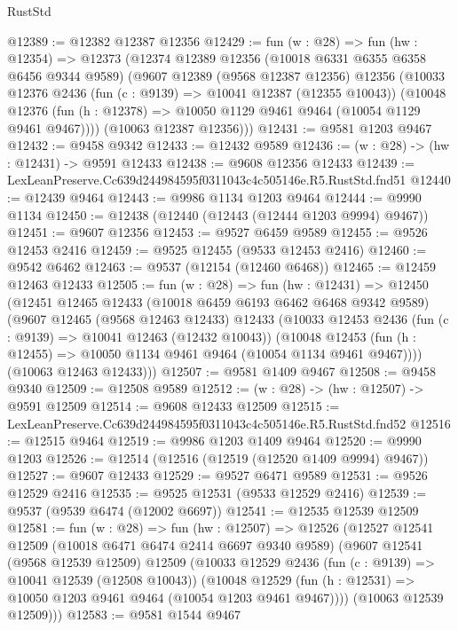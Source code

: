 \begin{lexlean}{RustStd}
\begin{coremodule}
@12389 := @12382 @12387 @12356
@12429 := fun (w : @28) =>
  fun (hw : @12354) =>
  @12373
    (@12374
      @12389
      @12356
      (@10018 @6331 @6355 @6358 @6456 @9344 @9589)
      (@9607
        @12389
        (@9568 @12387 @12356)
        @12356
        (@10033
          @12376
          @2436
          (fun (c : @9139) => @10041 @12387 (@12355 @10043))
          (@10048 @12376 (fun (h : @12378) => @10050 @1129 @9461 @9464 (@10054 @1129 @9461 @9467))))
        (@10063 @12387 @12356)))
@12431 := @9581 @1203 @9467
@12432 := @9458 @9342
@12433 := @12432 @9589
@12436 := (w : @28) -> (hw : @12431) -> @9591 @12433
@12438 := @9608 @12356 @12433
@12439 := LexLeanPreserve.Cc639d244984595f0311043c4c505146e.R5.RustStd.fnd51
@12440 := @12439 @9464
@12443 := @9986 @1134 @1203 @9464
@12444 := @9990 @1134
@12450 := @12438 (@12440 (@12443 (@12444 @1203 @9994) @9467))
@12451 := @9607 @12356
@12453 := @9527 @6459 @9589
@12455 := @9526 @12453 @2416
@12459 := @9525 @12455 (@9533 @12453 @2416)
@12460 := @9542 @6462
@12463 := @9537 (@12154 (@12460 @6468))
@12465 := @12459 @12463 @12433
@12505 := fun (w : @28) =>
  fun (hw : @12431) =>
  @12450
    (@12451
      @12465
      @12433
      (@10018 @6459 @6193 @6462 @6468 @9342 @9589)
      (@9607
        @12465
        (@9568 @12463 @12433)
        @12433
        (@10033
          @12453
          @2436
          (fun (c : @9139) => @10041 @12463 (@12432 @10043))
          (@10048 @12453 (fun (h : @12455) => @10050 @1134 @9461 @9464 (@10054 @1134 @9461 @9467))))
        (@10063 @12463 @12433)))
@12507 := @9581 @1409 @9467
@12508 := @9458 @9340
@12509 := @12508 @9589
@12512 := (w : @28) -> (hw : @12507) -> @9591 @12509
@12514 := @9608 @12433 @12509
@12515 := LexLeanPreserve.Cc639d244984595f0311043c4c505146e.R5.RustStd.fnd52
@12516 := @12515 @9464
@12519 := @9986 @1203 @1409 @9464
@12520 := @9990 @1203
@12526 := @12514 (@12516 (@12519 (@12520 @1409 @9994) @9467))
@12527 := @9607 @12433
@12529 := @9527 @6471 @9589
@12531 := @9526 @12529 @2416
@12535 := @9525 @12531 (@9533 @12529 @2416)
@12539 := @9537 (@9539 @6474 (@12002 @6697))
@12541 := @12535 @12539 @12509
@12581 := fun (w : @28) =>
  fun (hw : @12507) =>
  @12526
    (@12527
      @12541
      @12509
      (@10018 @6471 @6474 @2414 @6697 @9340 @9589)
      (@9607
        @12541
        (@9568 @12539 @12509)
        @12509
        (@10033
          @12529
          @2436
          (fun (c : @9139) => @10041 @12539 (@12508 @10043))
          (@10048 @12529 (fun (h : @12531) => @10050 @1203 @9461 @9464 (@10054 @1203 @9461 @9467))))
        (@10063 @12539 @12509)))
@12583 := @9581 @1544 @9467

\end{coremodule}
\end{lexlean}
